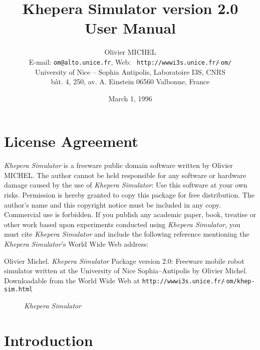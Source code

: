 \documentclass[a4paper,twoside]{article}
\begin{document}
\title{Khepera Simulator version 2.0 \\ User Manual}

\author{Olivier MICHEL \\
        E-mail: {\tt om@alto.unice.fr},
        Web: {\tt { http://wwwi3s.unice.fr/$\tilde{\ }$om/}} \\
        University of Nice -- Sophia Antipolis,
        Laboratoire I3S, CNRS \\
        b\^at. 4, 250, av. A. Einstein 06560 Valbonne, France
       }
\date{March 1, 1996}

\maketitle



\section{License Agreement}

{\em Khepera Simulator} is a freeware public domain software written by
Olivier MICHEL. The author cannot be held responsible for any software or
hardware damage caused by the use of {\em Khepera Simulator}: Use this
software at your own risks. Permission is hereby granted to copy this package
for free distribution. The author's name and this copyright notice must be
included in any copy. Commercial use is forbidden. If you publish any academic
paper, book, treatise or other work based upon experiments  conducted using
{\em Khepera Simulator}, you must cite {\em Khepera Simulator} and include the
following reference mentioning the {\em Khepera Simulator}'s World Wide Web
address:

\vspace{2mm}

\noindent
Olivier Michel. {\em Khepera Simulator} Package version 2.0: Freeware mobile
robot simulator written at the University of Nice Sophia--Antipolis by Olivier
Michel. Downloadable from the World Wide Web at
{\tt http://wwwi3s.unice.fr/$\tilde{\ }$om/khep-sim.html}

\begin{figure}[hpt]
\hspace{-0.1cm}
\caption{{\em Khepera Simulator}}
\label{sim}
\end{figure}

\section{Introduction}
\end{document}
